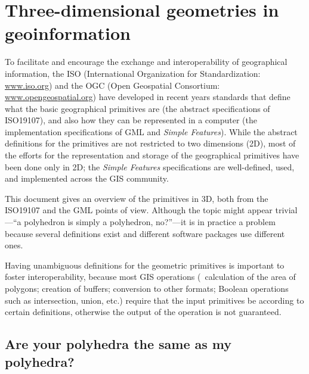 
\setchapterpreamble[u]{\margintoc}

\graphicspath{{iso19107/}}

\chapter{Three-dimensional geometries in geoinformation}%
\label{chap:iso19107}

To facilitate and encourage the exchange and interoperability of geographical information, the ISO (International Organization for Standardization: \url{www.iso.org}) and the OGC (Open Geospatial Consortium: \url{www.opengeospatial.org}) have developed in recent years standards that define what the basic geographical primitives are (the abstract specifications of ISO19107), and also how they can be represented in a computer (the implementation specifications of GML and \emph{Simple Features}). 
While the abstract definitions for the primitives are not restricted to two dimensions (2D), most of the efforts for the representation and storage of the geographical primitives have been done only in 2D; the \emph{Simple Features} specifications are well-defined, used, and implemented across the GIS community.

This document gives an overview of the primitives in 3D, both from the ISO19107 and the GML points of view.
Although the topic might appear trivial---``a polyhedron is simply a polyhedron, no?''---it is in practice a problem because several definitions exist and different software packages use different ones.

Having unambiguous definitions for the geometric primitives is important to foster interoperability, because most GIS operations (\eg\ calculation of the area of polygons; creation of buffers; conversion to other formats; Boolean operations such as intersection, union, etc.) require that the input primitives be according to certain definitions, otherwise the output of the operation is not guaranteed.

%
\section[Same polyhedra?]{Are your polyhedra the same as my polyhedra?}%
\label{sec:definition}

